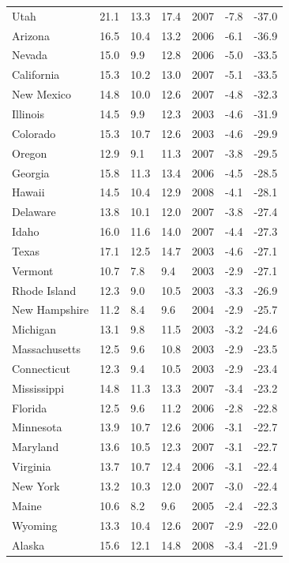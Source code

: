 \begin{longtable}{llllrll}
Utah & 21.1 & 13.3 & 17.4 & 2007 & -7.8 & -37.0 \\
Arizona & 16.5 & 10.4 & 13.2 & 2006 & -6.1 & -36.9 \\
Nevada & 15.0 & 9.9 & 12.8 & 2006 & -5.0 & -33.5 \\
California & 15.3 & 10.2 & 13.0 & 2007 & -5.1 & -33.5 \\
New Mexico & 14.8 & 10.0 & 12.6 & 2007 & -4.8 & -32.3 \\
Illinois & 14.5 & 9.9 & 12.3 & 2003 & -4.6 & -31.9 \\
Colorado & 15.3 & 10.7 & 12.6 & 2003 & -4.6 & -29.9 \\
Oregon & 12.9 & 9.1 & 11.3 & 2007 & -3.8 & -29.5 \\
Georgia & 15.8 & 11.3 & 13.4 & 2006 & -4.5 & -28.5 \\
Hawaii & 14.5 & 10.4 & 12.9 & 2008 & -4.1 & -28.1 \\
Delaware & 13.8 & 10.1 & 12.0 & 2007 & -3.8 & -27.4 \\
Idaho & 16.0 & 11.6 & 14.0 & 2007 & -4.4 & -27.3 \\
Texas & 17.1 & 12.5 & 14.7 & 2003 & -4.6 & -27.1 \\
Vermont & 10.7 & 7.8 & 9.4 & 2003 & -2.9 & -27.1 \\
Rhode Island & 12.3 & 9.0 & 10.5 & 2003 & -3.3 & -26.9 \\
New Hampshire & 11.2 & 8.4 & 9.6 & 2004 & -2.9 & -25.7 \\
Michigan & 13.1 & 9.8 & 11.5 & 2003 & -3.2 & -24.6 \\
Massachusetts & 12.5 & 9.6 & 10.8 & 2003 & -2.9 & -23.5 \\
Connecticut & 12.3 & 9.4 & 10.5 & 2003 & -2.9 & -23.4 \\
Mississippi & 14.8 & 11.3 & 13.3 & 2007 & -3.4 & -23.2 \\
Florida & 12.5 & 9.6 & 11.2 & 2006 & -2.8 & -22.8 \\
Minnesota & 13.9 & 10.7 & 12.6 & 2006 & -3.1 & -22.7 \\
Maryland & 13.6 & 10.5 & 12.3 & 2007 & -3.1 & -22.7 \\
Virginia & 13.7 & 10.7 & 12.4 & 2006 & -3.1 & -22.4 \\
New York & 13.2 & 10.3 & 12.0 & 2007 & -3.0 & -22.4 \\
Maine & 10.6 & 8.2 & 9.6 & 2005 & -2.4 & -22.3 \\
Wyoming & 13.3 & 10.4 & 12.6 & 2007 & -2.9 & -22.0 \\
Alaska & 15.6 & 12.1 & 14.8 & 2008 & -3.4 & -21.9 \\

\end{longtable}
